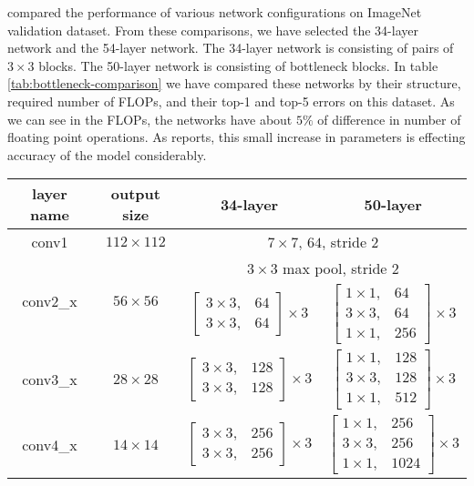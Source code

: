 \cite{He:2015aa} compared the performance of various network configurations on ImageNet validation dataset. From these comparisons, we have selected the 34-layer network and the 54-layer network. The 34-layer network is consisting of pairs of $3 \times 3$ blocks. The 50-layer network is consisting of bottleneck blocks. In table \ref{tab:bottleneck-comparison} we have compared these networks by their structure, required number of FLOPs, and their top-1 and top-5 errors on this dataset. As we can see in the FLOPs, the networks have about $5\%$ of difference in number of floating point operations. As \cite{He:2015aa} reports, this small increase in parameters is effecting accuracy of the model considerably. 

\begin{table}[]
\centering
\begin{tabular}{ | c | c | c | c | }
\hline
layer name			& output size 					& 34-layer																& 50-layer																			\\ \hline
conv1				& $112 \times112$				& \multicolumn{2}{c|}{$ 7 \times 7$, $64$, stride $2$}																												\\ \hline
\multirow{2}{*}{conv2\_x}	& \multirow{2}{*}{$56 \times 56$} 	& \multicolumn{2}{c|}{$3 \times 3$ max pool, stride $2$}																											\\ \cline{3-4} 
					&							& $\begin{bmatrix} 3 \times 3, &   64 \\ 3 \times 3, &   64 \end{bmatrix} \times 3 $		& $\begin{bmatrix}1 \times 1, & 64 \\ 3 \times 3, & 64 \\ 1 \times 1, & 256 \end{bmatrix}^{} \times 3 $ 		\\ \hline
conv3\_x				& $28 \times 28$				& $\begin{bmatrix} 3 \times 3, & 128 \\ 3 \times 3, & 128 \end{bmatrix} \times 3 $		& $\begin{bmatrix}1 \times 1, & 128 \\ 3 \times 3, & 128 \\ 1 \times 1, & 512 \end{bmatrix} \times 3$		\\ \hline
conv4\_x				& $14 \times 14$				& $\begin{bmatrix} 3 \times 3, & 256 \\ 3 \times 3, & 256 \end{bmatrix} \times 3 $		& $\begin{bmatrix}1 \times 1, & 256 \\ 3 \times 3, & 256 \\ 1 \times 1, & 1024 \end{bmatrix} \times 3$		\\ \hline

\end{tabular}
\end{table}
